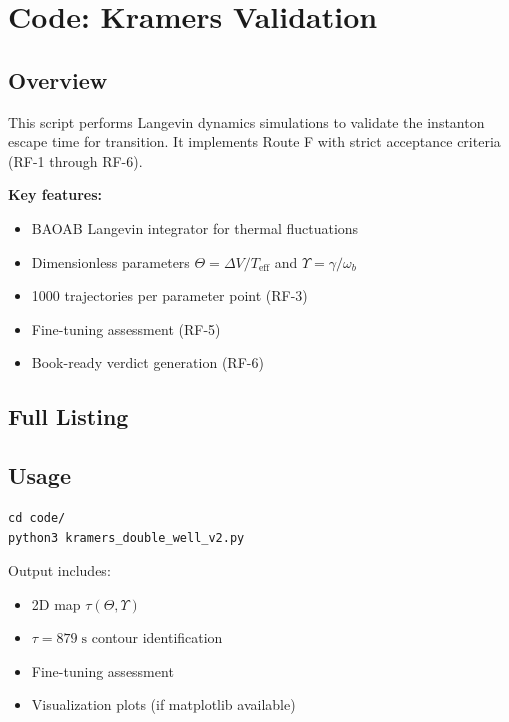 
\chapter{Code: Kramers Validation}
\label{app:kramers}

\section{Overview}

This script performs Langevin dynamics simulations to validate the instanton
escape time for \MetastableJunction{} transition. It implements Route F with strict
acceptance criteria (RF-1 through RF-6).

\textbf{Key features:}
\begin{itemize}
    \item BAOAB Langevin integrator for thermal fluctuations
    \item Dimensionless parameters $\Theta = \Delta V / T_{\text{eff}}$ and $\Upsilon = \gamma / \omega_b$
    \item 1000 trajectories per parameter point (RF-3)
    \item Fine-tuning assessment (RF-5)
    \item Book-ready verdict generation (RF-6)
\end{itemize}

\section{Full Listing}



\section{Usage}

\begin{verbatim}
cd code/
python3 kramers_double_well_v2.py
\end{verbatim}

Output includes:
\begin{itemize}
    \item 2D map $\tau(\Theta, \Upsilon)$
    \item $\tau = 879\;\text{s}$ contour identification
    \item Fine-tuning assessment
    \item Visualization plots (if matplotlib available)
\end{itemize}

